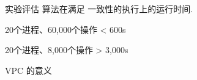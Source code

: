 \begin{frame}{实验评估}
  {\readcentric{} 算法在满足 \PRAM{} 一致性的执行上的运行时间.}

  \begin{description}
	\centering
	\item[\readcentric{}:] 20个进程、60,000个操作 < 600s
	\item[\rwclosure{}:] 20个进程、8,000个操作 > 3,000s
  \end{description}
\end{frame}
\begin{frame}{VPC 的意义}
\end{frame}
